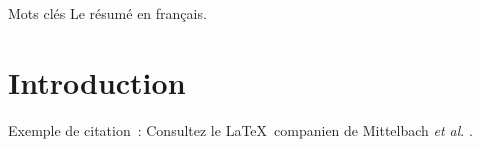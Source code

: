 
\maketitle

\begin{resume}{Mots clés}
  Le résumé en français.
\end{resume}

\begin{abstract}{Key words}
  The english abstract.
\end{abstract}

\section{Introduction}



Exemple de citation~: Consultez le \LaTeX\ companien
de Mittelbach {\it et al\/}\@. \citeyearpar{exemple}.

% 


\endinput
